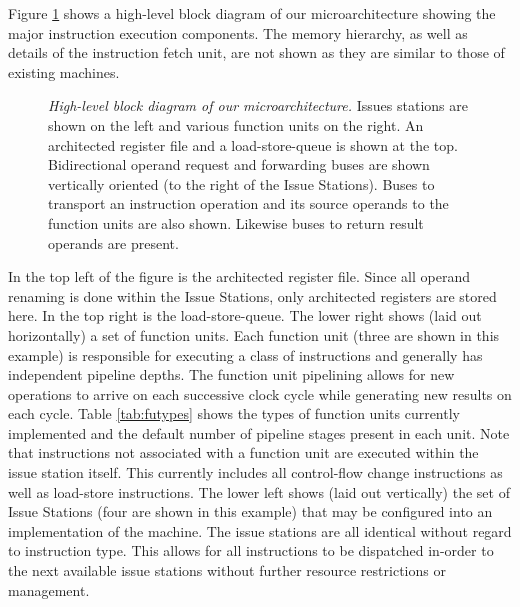 \documentclass[10pt,dvips]{article}
\begin{document}
Figure \ref{fig:overview} shows a high-level block diagram
of our microarchitecture showing the major instruction execution components.
The memory hierarchy, as well as details of the instruction fetch
unit, are not shown as they are similar to those of existing
machines.
%
\begin{figure}
\centering
\scriptsize {
}
\caption{{\em High-level block diagram of our microarchitecture.} 
Issues stations are shown on the left and various function
units on the right.  An architected register file and a
load-store-queue is shown at the top.
Bidirectional operand request and forwarding buses are shown
vertically oriented (to the right of the Issue Stations).
Buses to transport an instruction operation and its source operands
to the function units are also shown. 
Likewise buses to return result operands are present.}
\label{fig:overview}
\end{figure}
%
In the top left of the figure is the architected register file.
Since all operand renaming is done within the Issue Stations,
only architected registers are stored here.
In the top right is the load-store-queue.
The lower right shows (laid out horizontally) a set of function units.
Each function unit (three are shown in this example)
is responsible for executing a class of
instructions and generally has independent pipeline depths.
The function unit pipelining allows for new operations to arrive
on each successive clock cycle while generating new results on
each cycle.
Table \ref{tab:futypes} shows the types of function units
currently implemented and the default number of pipeline stages
present in each unit.
Note that instructions not associated with a function unit
are executed within the issue station itself.  This currently
includes all control-flow change instructions as well as load-store
instructions.  
The lower left shows (laid out vertically) the set of
Issue Stations (four are shown in this example)
that may be configured into an implementation of
the machine.
The issue stations are all identical without regard to 
instruction type.  This allows for all instructions to be
dispatched in-order to the next available issue stations 
without further resource restrictions or management.
%
%
\end{document}
